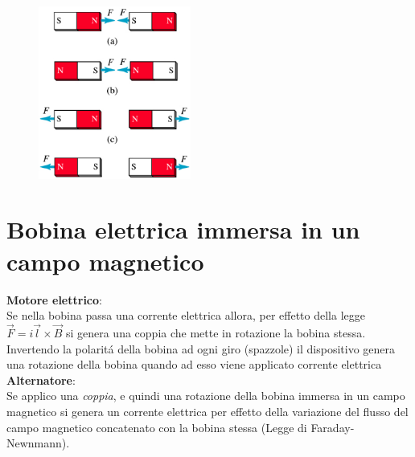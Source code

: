 \documentclass[17pt]{article}
\begin{document}




\begin{figure}[th]
\includegraphics[width=5cm]{PoliMagneici.png}
\centering%
\end{figure}









\section{Bobina elettrica immersa in un campo magnetico}

 





{\bf Motore elettrico}:\\
Se nella bobina passa una corrente elettrica allora, per effetto della legge $\vec{F}=i\vec{l}\times\vec{B}$ si genera una coppia che mette in rotazione la bobina stessa. Invertendo la polarit\'a della bobina ad ogni giro (spazzole) il dispositivo genera una rotazione della bobina quando ad esso viene applicato corrente elettrica\\
{\bf Alternatore}:\\
Se applico una \emph{coppia}, e quindi una rotazione della bobina immersa in un campo magnetico si genera un corrente elettrica per effetto della variazione del flusso del campo magnetico concatenato con la bobina stessa (Legge di Faraday-Newnmann).
\end{document}
